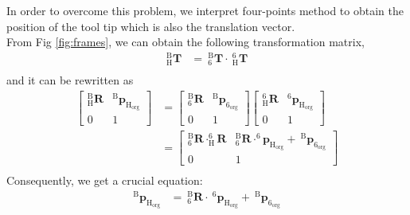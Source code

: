 In order to overcome this problem, we interpret four-points method to obtain the position of the tool tip which is also the translation vector.\\
From Fig \ref{fig:frames}, we can obtain the following transformation matrix,
\begin{equation}
\begin{split}
_{\mathrm{H}}^{\mathrm{B}}\mathbf{T} &=\ _{\mathrm{6}}^{\mathrm{B}}\mathbf{T}\cdot \ _{\mathrm{H}}^{\mathrm{6}}\mathbf{T}\\
\end{split}
\end{equation}		
and it can be rewritten as
\begin{equation}
\begin{split}																												
\begin{bmatrix}
_{\mathrm{H}}^{\mathrm{B}}\mathbf{R} & ^\mathrm{B}\!\boldsymbol{p}_\mathrm{H_{org}}\\ 
0 & 1
\end{bmatrix} &=
\begin{bmatrix}
_{\mathrm{6}}^{\mathrm{B}}\mathbf{R} & ^\mathrm{B}\!\boldsymbol{p}_\mathrm{6_{org}}\\ 
0 & 1
\end{bmatrix}
\begin{bmatrix}
_{\mathrm{H}}^{\mathrm{6}}\mathbf{R} & ^\mathrm{6}\!\boldsymbol{p}_\mathrm{H_{org}}\\ 
0 & 1
\end{bmatrix}\\
&= 
\begin{bmatrix}
_{\mathrm{6}}^{\mathrm{B}}\mathbf{R} \cdot _{\mathrm{H}}^{\mathrm{6}}\!\mathbf{R} & _{\mathrm{6}}^{\mathrm{B}}\mathbf{R} \cdot ^\mathrm{6}\!\!\boldsymbol{p}_\mathrm{H_{org}} +\ ^\mathrm{B}\!\boldsymbol{p}_\mathrm{6_{org}}\\ 
0 & 1
\end{bmatrix}\\
\end{split}
\end{equation}
Consequently, we get a crucial equation:
\begin{equation}
\begin{split}
^\mathrm{B}\!\boldsymbol{p}_\mathrm{H_{org}} &=\  _{\mathrm{6}}^{\mathrm{B}}\mathbf{R}\cdot\ ^\mathrm{6}\!\boldsymbol{p}_\mathrm{H_{org}} +\ ^\mathrm{B}\!\boldsymbol{p}_\mathrm{6_{org}}\\
\end{split}
\end{equation}
